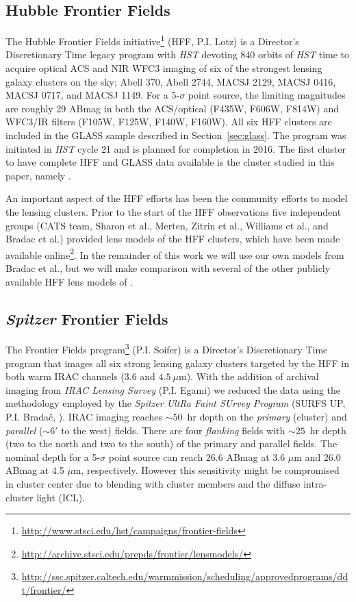 \subsection{Hubble Frontier Fields}
\label{sec:HFF}

The Hubble Frontier Fields initiative\footnote{\url{http://www.stsci.edu/hst/campaigns/frontier-fields}} (HFF,
P.I. Lotz) is a Director's Discretionary Time legacy program with \emph{HST} devoting 840 orbits of \emph{HST}
time to acquire optical ACS and NIR WFC3 imaging of six of the strongest lensing galaxy clusters on the sky;
Abell 370, Abell 2744, MACSJ 2129, MACSJ 0416, MACSJ 0717, and MACSJ 1149. For a 5-$\sigma$ point source, the
limiting magnitudes are roughly 29 ABmag in both the ACS/optical (F435W, F606W, F814W) and WFC3/IR filters
(F105W, F125W, F140W, F160W).  All six HFF clusters are included in the GLASS sample described in
Section~\ref{sec:glass}.  The program was initiated in \emph{HST} cycle 21 and is planned for completion in 2016.
The first cluster to have complete HFF and GLASS data available is the cluster studied in this paper, namely
\cler.

An important aspect of the HFF efforts has been the community efforts
to model the lensing clusters.  Prior to the start of the HFF
observations five independent groups (CATS team, Sharon et al.,
Merten, Zitrin et al., Williams et al., and Bradac et al.) provided
lens models of the HFF clusters, which have been made available
online\footnote{\url{http://archive.stsci.edu/prepds/frontier/lensmodels/}}.
In the remainder of this work we will use our own models from Bradac
et al., but we will make comparison with several of the other publicly
available HFF lens models of \cler.


\subsection{\textit{Spitzer} Frontier Fields}
\label{sec:spitz}

The \spitzer Frontier Fields
program\footnote{\url{http://ssc.spitzer.caltech.edu/warmmission/scheduling/approvedprograms/ddt/frontier/}}
(P.I. Soifer) is a Director's Discretionary Time program that images all six strong lensing galaxy clusters
targeted by the HFF in both warm IRAC channels ($3.6$ and $4.5~\mu$m).  With the addition of archival imaging
from  \emph{IRAC Lensing Survey} (P.I. Egami) we reduced the data using the methodology employed by the
\emph{Spitzer UltRa Faint SUrvey Program} (SURFS UP, P.I. Brada\v{c}, \citealp{2014ApJ...785..108B}). IRAC
imaging reaches $\sim\!50$~hr depth on the \emph{primary} (\cler cluster) and \emph{parallel} ($\sim\!6'$ to the
west) fields.  There are four \emph{flanking} fields with $\sim\!25$~hr depth (two to the north and two to the
south) of the primary and parallel fields. The nominal depth for a 5-$\sigma$ point source can reach 26.6
ABmag at 3.6 $\mu$m and 26.0 ABmag at 4.5 $\mu$m, respectively. However this sensitivity might be compromised in
cluster center due to blending with cluster members and the diffuse intra-cluster light (ICL).

